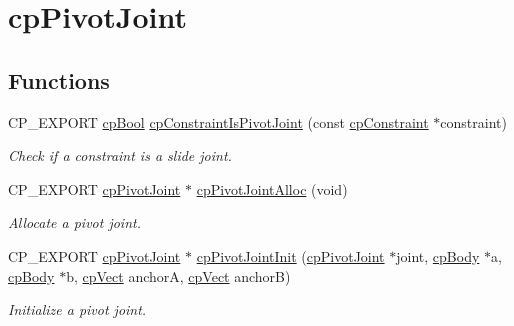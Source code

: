 \hypertarget{group__cpPivotJoint}{}\section{cp\+Pivot\+Joint}
\label{group__cpPivotJoint}
\subsection*{Functions}
\begin{DoxyCompactItemize}
\item 
\mbox{\label{group__cpPivotJoint_ga9a86164f24b20fb22ac14d96958cf6e3}} 
C\+P\+\_\+\+E\+X\+P\+O\+RT \hyperlink{group__basicTypes_gabc5e752c48f3449ca26ef413ecbd647e}{cp\+Bool} \hyperlink{group__cpPivotJoint_ga9a86164f24b20fb22ac14d96958cf6e3}{cp\+Constraint\+Is\+Pivot\+Joint} (const \hyperlink{structcpConstraint}{cp\+Constraint} $\ast$constraint)
\begin{DoxyCompactList}\small\item\em Check if a constraint is a slide joint. \end{DoxyCompactList}\item 
\mbox{\label{group__cpPivotJoint_ga4ebda8f4aee6da3adfb20f95bfc48860}} 
C\+P\+\_\+\+E\+X\+P\+O\+RT \hyperlink{structcpPivotJoint}{cp\+Pivot\+Joint} $\ast$ \hyperlink{group__cpPivotJoint_ga4ebda8f4aee6da3adfb20f95bfc48860}{cp\+Pivot\+Joint\+Alloc} (void)
\begin{DoxyCompactList}\small\item\em Allocate a pivot joint. \end{DoxyCompactList}\item 
\mbox{\label{group__cpPivotJoint_gab5c25ba159db93c37b4638ef24b7d70c}} 
C\+P\+\_\+\+E\+X\+P\+O\+RT \hyperlink{structcpPivotJoint}{cp\+Pivot\+Joint} $\ast$ \hyperlink{group__cpPivotJoint_gab5c25ba159db93c37b4638ef24b7d70c}{cp\+Pivot\+Joint\+Init} (\hyperlink{structcpPivotJoint}{cp\+Pivot\+Joint} $\ast$joint, \hyperlink{structcpBody}{cp\+Body} $\ast$a, \hyperlink{structcpBody}{cp\+Body} $\ast$b, \hyperlink{structcpVect}{cp\+Vect} anchorA, \hyperlink{structcpVect}{cp\+Vect} anchorB)
\begin{DoxyCompactList}\small\item\em Initialize a pivot joint. \end{DoxyCompactList}\item 

\end{DoxyCompactItemize}
